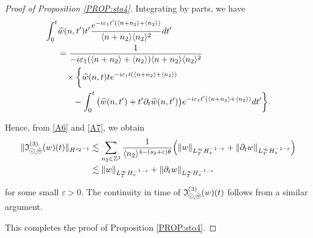 \documentclass[%
11pt,  reqno]{amsart}
\newcommand{\pe}{\mathbin{\scaleobj{0.7}{\tikz \draw (0,0) node[shape=circle,draw,inner sep=0pt,minimum size=8.5pt] {\scriptsize  $=$};}}}
\newcommand{\pl}{\mathbin{\scaleobj{0.7}{\tikz \draw (0,0) node[shape=circle,draw,inner sep=0pt,minimum size=8.5pt] {\scriptsize $<$};}}}
\newcommand{\1}{\hspace{0.2mm}\text{I}\hspace{0.2mm}}
\newcommand{\noi}{\noindent}
\newcommand{\Z}{\mathbb{Z}}
\newcommand{\eps}{\varepsilon}
\newcommand{\ft}{\widehat}
\newcommand{\dt}{\partial_t}
\newcommand{\les}{\lesssim}
\newcommand{\jb}[1]
{\langle #1 \rangle}
\newcommand{\If}{\mathfrak{I}}
\numberwithin{equation}{section}
\numberwithin{theorem}{section}
\begin{document}
\begin{proof}[Proof of Proposition \ref{PROP:sto4}]
\noi
Integrating by parts, we have
\begin{align}
\begin{split}
    \int_0^{t} 
& \ft w(n, t') t'    \frac{e^{ - i \eps_1   t'( \jb{n + n_2 }+ \jb{n_2})}}{  \jb{ n + n_2} \jb{n_2}^2} dt'\\
& = 
\frac{1}{ - i \eps_1   ( \jb{n + n_2 }+ \jb{n_2})\jb{ n + n_2} \jb{n_2}^2}\\
& \hphantom{X}
\times \bigg\{
\ft w(n, t) t e^{ - i \eps_1   t( \jb{n + n_2 }+ \jb{n_2})}\\
& \hphantom{XX}
 -     \int_0^{t} 
\big(\ft w(n, t')  + t' \dt\ft w(n, t') \big)   e^{ - i \eps_1   t'( \jb{n + n_2 }+ \jb{n_2})} dt'\bigg\}.
\end{split}
\label{A7}
\end{align}


\noi
Hence, from \eqref{A6} and \eqref{A7}, we obtain
\begin{align*}
\|\If_{\pl, \pe}^{(3)}(w) (t)\|_{H^{s_2 - 1}}
&  \les 
\sum_{n_2 \in \Z^3}
\frac{1}{\jb{n_2}^{4 - (s_2 + \eps) \theta}}
\Big(
\|w\|_{L^\infty_T H^{-1-\eps}_x} 
+ \|\dt w\|_{L^\infty_T H^{-1-\eps}_x} \Big)\\
&  \les 
\|w\|_{L^\infty_T H^{-1-\eps}_x} 
+ \|\dt w\|_{L^\infty_T H^{-1-\eps}_x}
\end{align*}

\noi
for some small $\eps > 0$.
The continuity in time of $\If_{\pl, \pe}^{(3)}(w)(t)$ follows from a similar argument.

This completes the proof of Proposition \ref{PROP:sto4}.
\end{proof}
\end{document}
